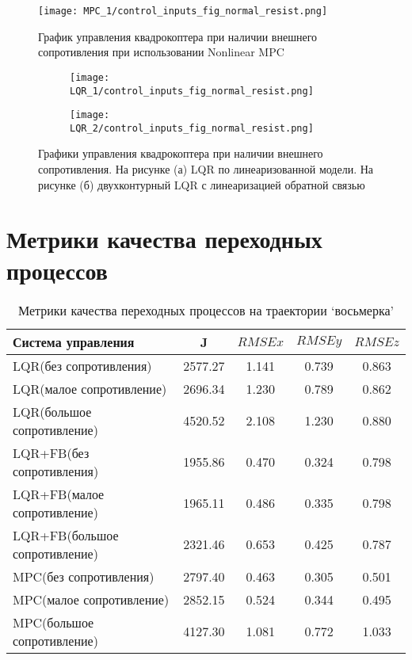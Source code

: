 \newpage

\begin{figure}[ht]
    \centering
    \texttt{[image: MPC\_1/control\_inputs\_fig\_normal\_resist.png]}
    \caption{График управления квадрокоптера при наличии внешнего сопротивления при использовании Nonlinear MPC}
    \label{}
\end{figure}

\begin{figure}[ht]
	\centering
\hspace*{\fill}%
	\begin{subfigure}[b]{0.49\textwidth}
        \centering
		\texttt{[image: LQR\_1/control\_inputs\_fig\_normal\_resist.png]}
		\caption{}
		\label{fig:tiger1}
	\end{subfigure}
\hfill
	\begin{subfigure}[b]{0.49\textwidth}
        \centering
		\texttt{[image: LQR\_2/control\_inputs\_fig\_normal\_resist.png]}
        \caption{}
		\label{fig:tiger2}
	\end{subfigure}
\hspace*{\fill}%
	\caption{Графики управления квадрокоптера при наличии внешнего сопротивления. На рисунке (а) LQR по линеаризованной модели. На рисунке (б) двухконтурный LQR с линеаризацией обратной связью}
	\label{fig:tiger}
\end{figure}


\section{Метрики качества переходных процессов}

\begin{table}[ht]
    \caption{Метрики качества переходных процессов на траектории `восьмерка'}
    \label{tab:t1}
    \centering
    \begin{tabular}{l c c c c}
    \hline
    Система управления  & {J} & {\(RMSE x\)} & {\(RMSE y\)} & {\(RMSE z\)}  \\ \hline
    LQR(без сопротивления) & 2577.27 & 1.141 & 0.739 & 0.863  \\
    LQR(малое сопротивление) & 2696.34 & 1.230 & 0.789 & 0.862 \\
    LQR(большое сопротивление) & 4520.52 & 2.108 & 1.230 & 0.880 \\
    LQR+FB(без сопротивления) & 1955.86 & 0.470 & 0.324 & 0.798\\
    LQR+FB(малое сопротивление) & 1965.11 & 0.486 & 0.335 & 0.798\\
    LQR+FB(большое сопротивление) & 2321.46 & 0.653 & 0.425 & 0.787  \\
    MPC(без сопротивления) & 2797.40 & 0.463 & 0.305 & 0.501\\
    MPC(малое сопротивление) & 2852.15 & 0.524 & 0.344 & 0.495   \\
    MPC(большое сопротивление) & 4127.30 & 1.081 & 0.772 & 1.033 \\ \hline
    \end{tabular}
\end{table}


